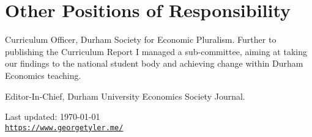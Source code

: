 \documentclass[letterpaper]{article}
\def\footerlink{https://www.georgetyler.me/}
\renewenvironment{itemize}{
  \begin{list}{}{
    \setlength{\leftmargin}{1.5em}
  }
}{
  \end{list}
}
\begin{document}
\section*{Other Positions of Responsibility}
\begin{itemize}
	\item Curriculum Officer, Durham Society for Economic Pluralism. Further to publishing the Curriculum Report I managed a sub-committee, aiming at taking our findings to the national student body and achieving change within Durham Economics teaching.
\item Editor-In-Chief, Durham University Economics Society Journal.

\end{itemize}





\bigskip

\begin{center}
  \begin{footnotesize}
    Last updated: \today \\
    \href{\footerlink}{\texttt{\footerlink}}
  \end{footnotesize}
\end{center}
\end{document}
